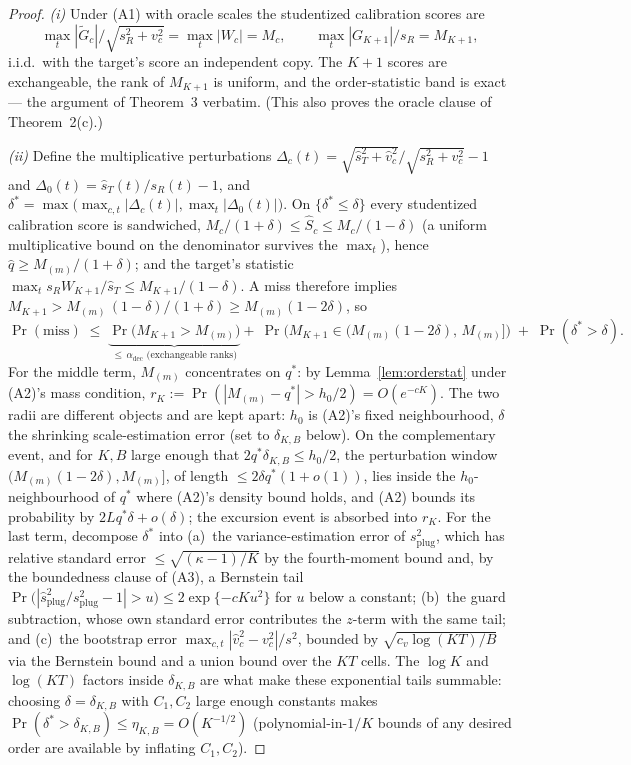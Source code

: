 \documentclass[12pt]{article}
\theoremstyle{definition}
\theoremstyle{remark}
\newcommand{\Gtilde}{\widetilde{G}}
\begin{document}
\begin{proof}
\emph{(i)} Under (A1) with oracle scales the studentized calibration scores
are
\[
\max_t|\Gtilde_c|\big/\sqrt{s_R^2+v_c^2}=\max_t|W_c|=M_c,
\qquad
\max_t|G_{K+1}|\big/s_R=M_{K+1},
\]
i.i.d.\ with the target's score an independent copy. The $K{+}1$
scores are exchangeable, the rank of $M_{K+1}$ is uniform, and the order-statistic
band is exact --- the argument of Theorem~3 verbatim. (This also proves the oracle
clause of Theorem~2(c).)

\emph{(ii)} Define the multiplicative perturbations
$\Delta_c(t)=\sqrt{\widehat s_T^2+\widehat v_c^2}\big/\sqrt{s_R^2+v_c^2}-1$ and
$\Delta_0(t)=\widehat s_T(t)/s_R(t)-1$, and $\delta^*=\max\big(\max_{c,t}|\Delta_c(t)|,
\max_t|\Delta_0(t)|\big)$. On $\{\delta^*\le\delta\}$ every studentized calibration
score is sandwiched, $M_c/(1+\delta)\le\widehat S_c\le M_c/(1-\delta)$ (a uniform
multiplicative bound on the denominator survives the $\max_t$), hence
$\widehat q\ge M_{(m)}/(1+\delta)$; and the target's statistic
$\max_t s_RW_{K+1}/\widehat s_T\le M_{K+1}/(1-\delta)$. A miss therefore implies
$M_{K+1}>M_{(m)}\,(1-\delta)/(1+\delta)\ge M_{(m)}(1-2\delta)$, so
\[
\Pr(\text{miss})\;\le\;\underbrace{\Pr\big(M_{K+1}>M_{(m)}\big)}_{\le\,\alpha_{\text{dec}}
\text{ (exchangeable ranks)}}
+\ \Pr\big(M_{K+1}\in(M_{(m)}(1-2\delta),\,M_{(m)}]\big)\;+\;\Pr(\delta^*>\delta).
\]
For the middle term, $M_{(m)}$ concentrates on $q^*$: by
Lemma~\ref{lem:orderstat} under (A2)'s mass condition,
$r_K:=\Pr(|M_{(m)}-q^*|>h_0/2)=O(e^{-cK})$. The two radii are different
objects and are kept apart: $h_0$ is (A2)'s fixed neighbourhood, $\delta$
the shrinking scale-estimation error (set to $\delta_{K,B}$ below). On the
complementary event, and for $K,B$ large enough that
$2q^*\delta_{K,B}\le h_0/2$, the perturbation window
$(M_{(m)}(1-2\delta),M_{(m)}]$, of length $\le2\delta q^*(1+o(1))$, lies
inside the $h_0$-neighbourhood of $q^*$ where (A2)'s density bound holds, and
(A2) bounds its probability by $2Lq^*\delta+o(\delta)$; the excursion event
is absorbed into $r_K$. For the last term, decompose
$\delta^*$ into (a)~the variance-estimation error of $s_{\text{plug}}^2$, which has
relative standard error $\le\sqrt{(\kappa-1)/K}$ by the fourth-moment bound and,
by the boundedness clause of (A3), a Bernstein tail
$\Pr\big(|\widehat s_{\text{plug}}^2/s_{\text{plug}}^2-1|>u\big)\le
2\exp\{-cKu^2\}$ for $u$ below a constant; (b)~the guard subtraction, whose own
standard error contributes the $z$-term with the same tail; and (c)~the bootstrap
error $\max_{c,t}|\widehat v_c^2-v_c^2|/s^2$, bounded by $\sqrt{c_v\log(KT)/B}$ via
the Bernstein bound and a union bound over the $KT$ cells. The $\log K$ and
$\log(KT)$ factors inside $\delta_{K,B}$ are what make these exponential tails
summable: choosing $\delta=\delta_{K,B}$ with $C_1,C_2$ large enough constants makes
$\Pr(\delta^*>\delta_{K,B})\le\eta_{K,B}=O(K^{-1/2})$ (polynomial-in-$1/K$ bounds of
any desired order are available by inflating $C_1,C_2$).


\end{proof}
\end{document}
